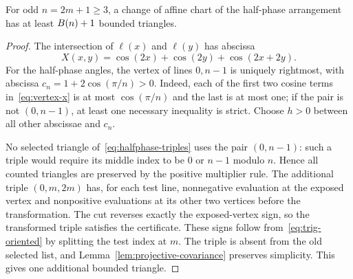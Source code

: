\begin{lemma}\label{lem:one-cap}
For odd $n=2m+1\ge3$, a change of affine chart of the half-phase arrangement has at least $B(n)+1$ bounded triangles.
\end{lemma}
\begin{proof}
The intersection of $\ell(x)$ and $\ell(y)$ has abscissa
\begin{equation}\label{eq:vertex-x}
X(x,y)=\cos(2x)+\cos(2y)+\cos(2x+2y).
\end{equation}
For the half-phase angles, the vertex of lines $0,n-1$ is uniquely rightmost, with abscissa $c_n=1+2\cos(\pi/n)>0$. Indeed, each of the first two cosine terms in~\eqref{eq:vertex-x} is at most $\cos(\pi/n)$ and the last is at most one; if the pair is not $(0,n-1)$, at least one necessary inequality is strict. Choose $h>0$ between all other abscissae and $c_n$.

No selected triangle of~\eqref{eq:halfphase-triples} uses the pair $(0,n-1)$: such a triple would require its middle index to be $0$ or $n-1$ modulo $n$. Hence all counted triangles are preserved by the positive multiplier rule. The additional triple $(0,m,2m)$ has, for each test line, nonnegative evaluation at the exposed vertex and nonpositive evaluations at its other two vertices before the transformation. The cut reverses exactly the exposed-vertex sign, so the transformed triple satisfies the certificate. These signs follow from~\eqref{eq:trig-oriented} by splitting the test index at $m$. The triple is absent from the old selected list, and Lemma~\ref{lem:projective-covariance} preserves simplicity. This gives one additional bounded triangle.
\end{proof}

